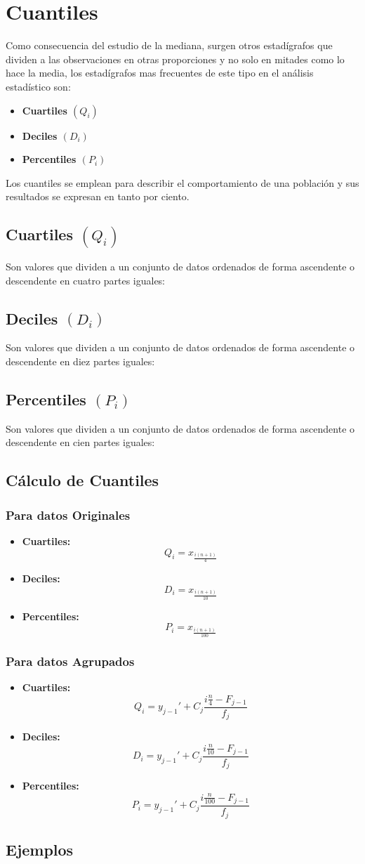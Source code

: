 \section{Cuantiles}
Como consecuencia del estudio de la mediana, surgen otros estadígrafos que dividen a las observaciones en otras proporciones y no solo en mitades como lo hace la media, los estadígrafos mas frecuentes de este tipo en el análisis estadístico son:
\begin{itemize}
\item \textbf{Cuartiles $(Q_i)$}
\item \textbf{Deciles $(D_i)$}
\item \textbf{Percentiles $(P_i)$}
\end{itemize}
Los cuantiles se emplean para describir el comportamiento de una población y sus resultados se expresan en tanto por ciento.
\subsection{Cuartiles $(Q_i)$}
Son valores que dividen a un conjunto de datos ordenados de forma ascendente o descendente en cuatro partes iguales:
\subsection{Deciles $(D_i)$}
Son valores que dividen a un conjunto de datos ordenados de forma ascendente o descendente en diez partes iguales:
\subsection{Percentiles $(P_i)$}
Son valores que dividen a un conjunto de datos ordenados de forma ascendente o descendente en cien partes iguales:
\subsection{Cálculo de Cuantiles}
\subsubsection{Para datos Originales}
\begin{itemize}
\item \textbf{Cuartiles:}
$$Q_i=x_{\frac{i(n+1)}{4}}$$
\item \textbf{Deciles:}
$$D_i=x_{\frac{i(n+1)}{10}}$$
\item \textbf{Percentiles:}
$$P_i=x_{\frac{i(n+1)}{100}}$$
\end{itemize}
\subsubsection{Para datos Agrupados}
\begin{itemize}
\item \textbf{Cuartiles:}
$$Q_i=y_{j-1}'+C_j\dfrac{i\frac{n}{4}-F_{j-1}}{f_j}$$
\item \textbf{Deciles:}
$$D_i=y_{j-1}'+C_j\dfrac{i\frac{n}{10}-F_{j-1}}{f_j}$$
\item \textbf{Percentiles:}
$$P_i=y_{j-1}'+C_j\dfrac{i\frac{n}{100}-F_{j-1}}{f_j}$$
\end{itemize}
\subsection{Ejemplos}